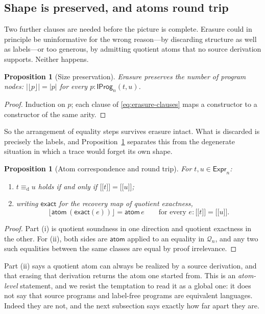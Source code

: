 \documentclass[10pt,reqno]{amsart}
\newtheorem{proposition}[theorem]{Proposition}
\newcommand{\Expr}{\mathsf{Expr}}
\newcommand{\IProg}{\mathsf{IProg}}
\newcommand{\den}[1]{\mathopen{\lbrack\!\lbrack}#1\mathclose{\rbrack\!\rbrack}}
\newcommand{\defeq}{\mathrel{\equiv_{\mathrm d}}}
\newcommand{\Q}{\mathcal{Q}}
\begin{document}
\subsection{Shape is preserved, and atoms round trip}

Two further clauses are needed before the picture is complete.  Erasure could
in principle be uninformative for the wrong reason---by discarding structure as
well as labels---or too generous, by admitting quotient atoms that no source
derivation supports.  Neither happens.

\begin{proposition}[Size preservation]
\label{prop:erasure-size}
Erasure preserves the number of program nodes:
\(|\lfloor p\rfloor|=|p|\) for every \(p:\IProg_n(t,u)\).
\end{proposition}

\begin{proof}
Induction on \(p\); each clause of \eqref{eq:erasure-clauses} maps a
constructor to a constructor of the same arity.
\end{proof}

So the arrangement of equality steps survives erasure intact.  What is
discarded is precisely the labels, and Proposition~\ref{prop:erasure-size}
separates this from the degenerate situation in which a trace would forget its
own shape.

\begin{proposition}[Atom correspondence and round trip]
\label{prop:erasure-roundtrip}
For \(t,u\in\Expr_n\):
\begin{enumerate}[label=(\roman*)]
\item \(t\defeq u\) holds if and only if \(\den t=\den u\);
\item writing \(\mathsf{exact}\) for the recovery map of quotient exactness,
  \[
   \bigl\lfloor\mathsf{atom}\,(\mathsf{exact}(e))\bigr\rfloor
   =\mathsf{atom}\,e
   \qquad\text{for every }e:\den t=\den u.
  \tag{9.4}\label{eq:atom-roundtrip}
  \]
\end{enumerate}
\end{proposition}

\begin{proof}
Part (i) is quotient soundness in one direction and quotient exactness in the
other.  For (ii), both sides are \(\mathsf{atom}\) applied to an equality in
\(\Q_n\), and any two such equalities between the same classes are equal by
proof irrelevance.
\end{proof}

Part (ii) says a quotient atom can always be realized by a source derivation,
and that erasing that derivation returns the atom one started from.  This is an
\emph{atom-level} statement, and we resist the temptation to read it as a
global one: it does not say that source programs and label-free programs are
equivalent languages.  Indeed they are not, and the next subsection says
exactly how far apart they are.
\end{document}
